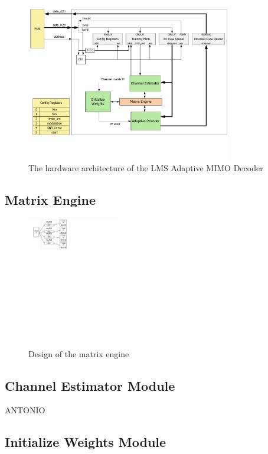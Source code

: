 \documentclass[journal]{IEEEtran}
\begin{document}
\begin{figure}[!h]
\centering
\includegraphics*[width=9cm, viewport = 0 90 789 600]{images/top_level_arch.pdf}
\caption{The hardware architecture of the LMS Adaptive MIMO Decoder}
\label{top_level_arch}
\end{figure}

\subsection{Matrix Engine}

\begin{figure}[!h]
\centering
\includegraphics*[width=4cm, viewport = 30 640 260 840]{images/matrix_engine.pdf}
\caption{Design of the matrix engine}
\label{matrix_engine}
\end{figure}

\subsection{Channel Estimator Module}

ANTONIO

\subsection{Initialize Weights Module}
\end{document}
